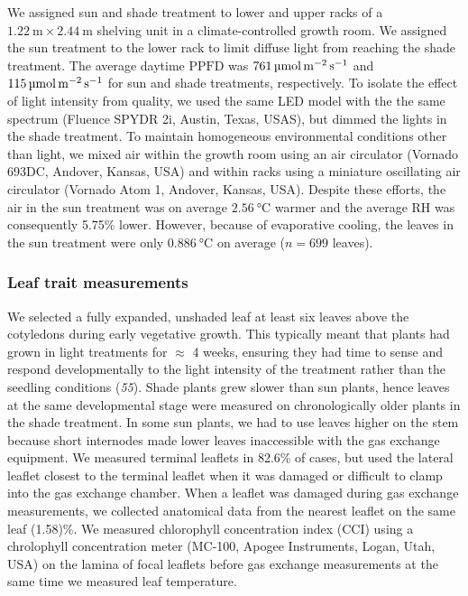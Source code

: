 \documentclass[
  letterpaper,
  DIV=11,
  numbers=noendperiod]{scrartcl}
\newcommand{\ppfd}{$\mathrm{PPFD}$}
\newcommand{\ppfdqty}[1]{$\qty{#1}{\micro\mol\raiseto{-2}\meter\raiseto{-1}\second}$}
\begin{document}
We assigned sun and shade treatment to lower and upper racks of a
\(\qty{1.22}{\meter} \times \qty{2.44}{\meter}\) shelving unit in a
climate-controlled growth room. We assigned the sun treatment to the
lower rack to limit diffuse light from reaching the shade treatment. The
average daytime \ppfd{} was \ppfdqty{761} and \ppfdqty{115} for sun and
shade treatments, respectively. To isolate the effect of light intensity
from quality, we used the same LED model with the the same spectrum
(Fluence SPYDR 2i, Austin, Texas, USAS), but dimmed the lights in the
shade treatment. To maintain homogeneous environmental conditions other
than light, we mixed air within the growth room using an air circulator
(Vornado 693DC, Andover, Kansas, USA) and within racks using a miniature
oscillating air circulator (Vornado Atom 1, Andover, Kansas, USA).
Despite these efforts, the air in the sun treatment was on average
\(\qty{2.56}{\degreeCelsius}\) warmer and the average RH was
consequently 5.75\% lower. However, because of evaporative cooling, the
leaves in the sun treatment were only \(\qty{0.886}{\degreeCelsius}\) on
average (\(n = 699\) leaves).

\subsubsection{Leaf trait measurements}\label{leaf-trait-measurements}

We selected a fully expanded, unshaded leaf at least six leaves above
the cotyledons during early vegetative growth. This typically meant that
plants had grown in light treatments for \(\approx\) 4 weeks, ensuring
they had time to sense and respond developmentally to the light
intensity of the treatment rather than the seedling conditions
(\emph{55}). Shade plants grew slower than sun plants, hence leaves at
the same developmental stage were measured on chronologically older
plants in the shade treatment. In some sun plants, we had to use leaves
higher on the stem because short internodes made lower leaves
inaccessible with the gas exchange equipment. We measured terminal
leaflets in 82.6\% of cases, but used the lateral leaflet closest to the
terminal leaflet when it was damaged or difficult to clamp into the gas
exchange chamber. When a leaflet was damaged during gas exchange
measurements, we collected anatomical data from the nearest leaflet on
the same leaf (1.58)\%. We measured chlorophyll concentration index
(CCI) using a chrolophyll concentration meter (MC-100, Apogee
Instruments, Logan, Utah, USA) on the lamina of focal leaflets before
gas exchange measurements at the same time we measured leaf temperature.
\end{document}

